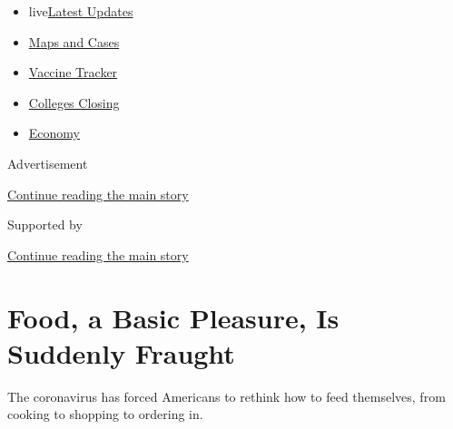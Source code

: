 \begin{itemize}
\tightlist
\item
  live\href{https://www.nytimes3xbfgragh.onion/2020/08/21/world/covid-19-coronavirus.html?name=styln-coronavirus-national\&region=TOP_BANNER\&variant=undefined\&block=storyline_menu_recirc\&action=click\&pgtype=Article\&impression_id=58e38ea1-e392-11ea-982c-75d1fa15f353}{Latest
  Updates}
\item
  \href{https://www.nytimes3xbfgragh.onion/interactive/2020/us/coronavirus-us-cases.html?name=styln-coronavirus-national\&region=TOP_BANNER\&variant=undefined\&block=storyline_menu_recirc\&action=click\&pgtype=Article\&impression_id=58e3b5b0-e392-11ea-982c-75d1fa15f353}{Maps
  and Cases}
\item
  \href{https://www.nytimes3xbfgragh.onion/interactive/2020/science/coronavirus-vaccine-tracker.html?name=styln-coronavirus-national\&region=TOP_BANNER\&variant=undefined\&block=storyline_menu_recirc\&action=click\&pgtype=Article\&impression_id=58e3b5b1-e392-11ea-982c-75d1fa15f353}{Vaccine
  Tracker}
\item
  \href{https://www.nytimes3xbfgragh.onion/2020/08/19/us/colleges-closing-covid.html?name=styln-coronavirus-national\&region=TOP_BANNER\&variant=undefined\&block=storyline_menu_recirc\&action=click\&pgtype=Article\&impression_id=58e3b5b2-e392-11ea-982c-75d1fa15f353}{Colleges
  Closing}
\item
  \href{https://www.nytimes3xbfgragh.onion/live/2020/08/20/business/stock-market-today-coronavirus?name=styln-coronavirus-national\&region=TOP_BANNER\&variant=undefined\&block=storyline_menu_recirc\&action=click\&pgtype=Article\&impression_id=58e3b5b3-e392-11ea-982c-75d1fa15f353}{Economy}
\end{itemize}

Advertisement

\protect\hyperlink{after-top}{Continue reading the main story}

Supported by

\protect\hyperlink{after-sponsor}{Continue reading the main story}

\hypertarget{food-a-basic-pleasure-is-suddenly-fraught}{%
\section{Food, a Basic Pleasure, Is Suddenly
Fraught}\label{food-a-basic-pleasure-is-suddenly-fraught}}

The coronavirus has forced Americans to rethink how to feed themselves,
from cooking to shopping to ordering in.

